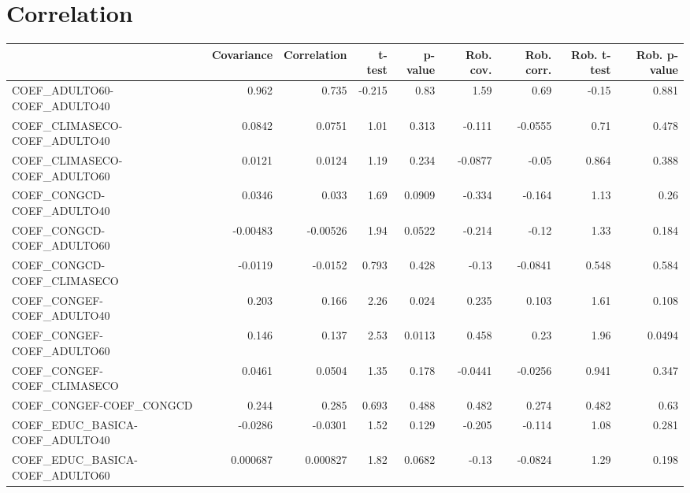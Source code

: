 \section{Correlation}
\begin{tabular}{lrrrrrrrr}
\toprule
{} &  Covariance &  Correlation &  t-test &  p-value &  Rob. cov. &  Rob. corr. &  Rob. t-test &  Rob. p-value \\
\midrule
COEF\_ADULTO60-COEF\_ADULTO40         &       0.962 &        0.735 &  -0.215 &     0.83 &       1.59 &        0.69 &        -0.15 &         0.881 \\
COEF\_CLIMASECO-COEF\_ADULTO40        &      0.0842 &       0.0751 &    1.01 &    0.313 &     -0.111 &     -0.0555 &         0.71 &         0.478 \\
COEF\_CLIMASECO-COEF\_ADULTO60        &      0.0121 &       0.0124 &    1.19 &    0.234 &    -0.0877 &       -0.05 &        0.864 &         0.388 \\
COEF\_CONGCD-COEF\_ADULTO40           &      0.0346 &        0.033 &    1.69 &   0.0909 &     -0.334 &      -0.164 &         1.13 &          0.26 \\
COEF\_CONGCD-COEF\_ADULTO60           &    -0.00483 &     -0.00526 &    1.94 &   0.0522 &     -0.214 &       -0.12 &         1.33 &         0.184 \\
COEF\_CONGCD-COEF\_CLIMASECO          &     -0.0119 &      -0.0152 &   0.793 &    0.428 &      -0.13 &     -0.0841 &        0.548 &         0.584 \\
COEF\_CONGEF-COEF\_ADULTO40           &       0.203 &        0.166 &    2.26 &    0.024 &      0.235 &       0.103 &         1.61 &         0.108 \\
COEF\_CONGEF-COEF\_ADULTO60           &       0.146 &        0.137 &    2.53 &   0.0113 &      0.458 &        0.23 &         1.96 &        0.0494 \\
COEF\_CONGEF-COEF\_CLIMASECO          &      0.0461 &       0.0504 &    1.35 &    0.178 &    -0.0441 &     -0.0256 &        0.941 &         0.347 \\
COEF\_CONGEF-COEF\_CONGCD             &       0.244 &        0.285 &   0.693 &    0.488 &      0.482 &       0.274 &        0.482 &          0.63 \\
COEF\_EDUC\_BASICA-COEF\_ADULTO40      &     -0.0286 &      -0.0301 &    1.52 &    0.129 &     -0.205 &      -0.114 &         1.08 &         0.281 \\
COEF\_EDUC\_BASICA-COEF\_ADULTO60      &    0.000687 &     0.000827 &    1.82 &   0.0682 &      -0.13 &     -0.0824 &         1.29 &         0.198 \\

\end{tabular}
